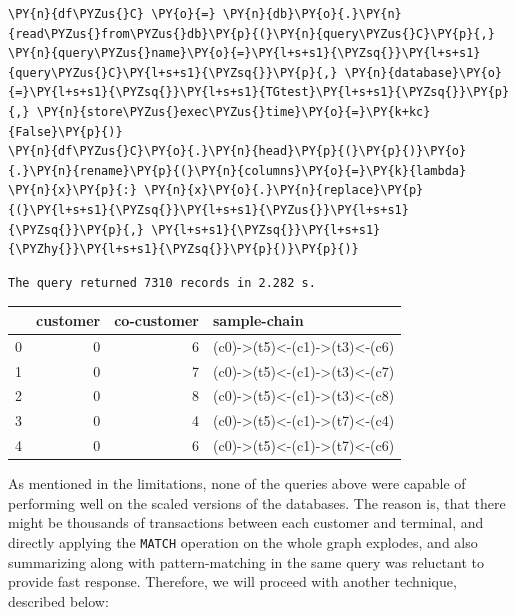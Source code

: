     \begin{tcolorbox}[breakable, size=fbox, boxrule=1pt, pad at break*=1mm,colback=cellbackground, colframe=cellborder]
\begin{Verbatim}[commandchars=\\\{\}]
\PY{n}{df\PYZus{}C} \PY{o}{=} \PY{n}{db}\PY{o}{.}\PY{n}{read\PYZus{}from\PYZus{}db}\PY{p}{(}\PY{n}{query\PYZus{}C}\PY{p}{,} \PY{n}{query\PYZus{}name}\PY{o}{=}\PY{l+s+s1}{\PYZsq{}}\PY{l+s+s1}{query\PYZus{}C}\PY{l+s+s1}{\PYZsq{}}\PY{p}{,} \PY{n}{database}\PY{o}{=}\PY{l+s+s1}{\PYZsq{}}\PY{l+s+s1}{TGtest}\PY{l+s+s1}{\PYZsq{}}\PY{p}{,} \PY{n}{store\PYZus{}exec\PYZus{}time}\PY{o}{=}\PY{k+kc}{False}\PY{p}{)}
\PY{n}{df\PYZus{}C}\PY{o}{.}\PY{n}{head}\PY{p}{(}\PY{p}{)}\PY{o}{.}\PY{n}{rename}\PY{p}{(}\PY{n}{columns}\PY{o}{=}\PY{k}{lambda} \PY{n}{x}\PY{p}{:} \PY{n}{x}\PY{o}{.}\PY{n}{replace}\PY{p}{(}\PY{l+s+s1}{\PYZsq{}}\PY{l+s+s1}{\PYZus{}}\PY{l+s+s1}{\PYZsq{}}\PY{p}{,} \PY{l+s+s1}{\PYZsq{}}\PY{l+s+s1}{\PYZhy{}}\PY{l+s+s1}{\PYZsq{}}\PY{p}{)}\PY{p}{)}
\end{Verbatim}
\end{tcolorbox}

    \begin{Verbatim}[commandchars=\\\{\}]
The query returned 7310 records in 2.282 s.
    \end{Verbatim}
 
            
    
    \begin{center}
\begin{tabular}{lrrl}
\toprule
 & customer & co-customer & sample-chain \\
\midrule
0 & 0 & 6 & (c0)->(t5)<-(c1)->(t3)<-(c6) \\
1 & 0 & 7 & (c0)->(t5)<-(c1)->(t3)<-(c7) \\
2 & 0 & 8 & (c0)->(t5)<-(c1)->(t3)<-(c8) \\
3 & 0 & 4 & (c0)->(t5)<-(c1)->(t7)<-(c4) \\
4 & 0 & 6 & (c0)->(t5)<-(c1)->(t7)<-(c6) \\
\bottomrule
\end{tabular}

\end{center}

    

    As mentioned in the limitations, none of the queries above were capable
of performing well on the scaled versions of the databases. The reason
is, that there might be thousands of transactions between each customer
and terminal, and directly applying the \texttt{MATCH} operation on the
whole graph explodes, and also summarizing along with pattern-matching
in the same query was reluctant to provide fast response. Therefore, we
will proceed with another technique, described below:

